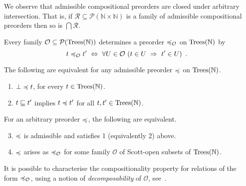 We observe that admissible compositional preorders are closed under arbitrary intersection. That is, if
$\mathcal{R} \subseteq \mathcal{P}(\mathbb{N} \times \mathbb{N})$ is a family of admissible compositional preorders
then so is $\bigcap \mathcal{R}$.

Every family $\mathcal{O} \subseteq \mathcal{P}(\textnormal{Trees}(\mathbb{N}))$ determines a preorder $\preccurlyeq_\mathcal{O}$ on 
$\textnormal{Trees}(\mathbb{N})$ by
\begin{equation}
\label{equation:observational-preorder}
t \preccurlyeq_\mathcal{O} t' ~ \Leftrightarrow ~ \forall U \in \mathcal{O}~ (t \in U ~ \Rightarrow ~ t' \in U) \enspace .
\end{equation}

\begin{proposition} 
The following are equivalent for
any admissible  preorder  $\preccurlyeq$ on $\textnormal{Trees}(\mathbb{N})$.
\begin{enumerate} 
\item $\bot \preccurlyeq t$,  for every $t \in \textnormal{Trees}(\mathbb{N})$.
\item $t \sqsubseteq t'$ implies $t \preccurlyeq t'$ for all $t,t' \in \textnormal{Trees}(\mathbb{N})$.
\end{enumerate}
For an arbitrary preorder $\preccurlyeq$, the following are equivalent.
\begin{enumerate}
\setcounter{enumi}{2}
\item $\preccurlyeq$ is admissible and satisfies 1 (equivalently 2) above.
\item $\preccurlyeq$ arises as $\preccurlyeq_\mathcal{O}$ for some family $\mathcal{O}$ of Scott-open subsets
of $\textnormal{Trees}(\mathbb{N})$.
\end{enumerate}
\end{proposition}

It is possible to characterise the compositionality property for relations of the form $\preccurlyeq_\mathcal{O}$, using a notion of \emph{decomposability} of $\mathcal{O}$, see~\cite{gom}. 



